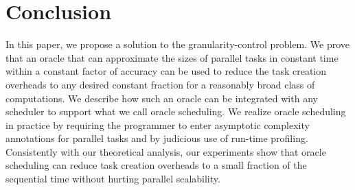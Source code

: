 \section{Conclusion}

In this paper, we propose a solution to the granularity-control
problem.  We prove that an oracle that can approximate the sizes of
parallel tasks in constant time within a constant factor of accuracy
can be used to reduce the task creation overheads to any desired
constant fraction for a reasonably broad class of computations.  We
describe how such an oracle can be integrated with any scheduler to
support what we call oracle scheduling.  We realize oracle scheduling
in practice by requiring the programmer to enter asymptotic complexity
annotations for parallel tasks and by judicious use of run-time
profiling.  Consistently with our theoretical analysis, our
experiments show that oracle scheduling can reduce task creation
overheads to a small fraction of the sequential time without hurting
parallel scalability.





